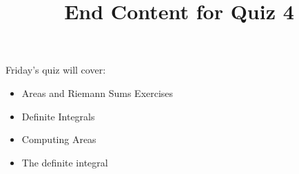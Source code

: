 \documentclass{ximera}
\title{End Content for Quiz 4}
\begin{document}
\begin{abstract}
\end{abstract}

\maketitle

\begin{sectionOutcomes}

Friday's quiz will cover:





\begin{itemize}
\item Areas and Riemann Sums Exercises
\item Definite Integrals
\item Computing Areas
\item The definite integral
\end{itemize}


\end{sectionOutcomes}
\end{document}

